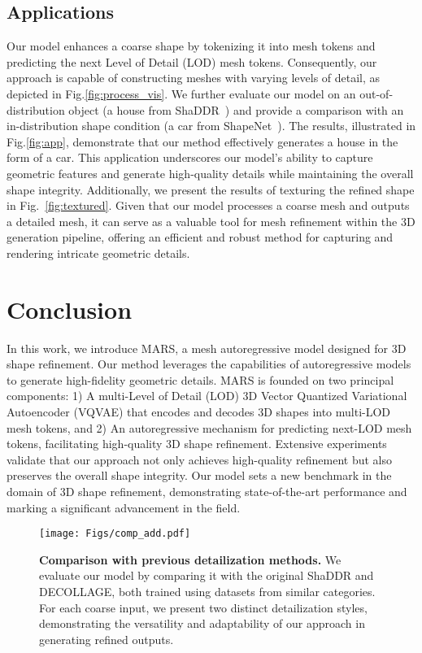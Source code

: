\subsection{Applications}
Our model enhances a coarse shape by tokenizing it into mesh tokens and predicting the next Level of Detail (LOD) mesh tokens. Consequently, our approach is capable of constructing meshes with varying levels of detail, as depicted in Fig.\ref{fig:process_vis}. We further evaluate our model on an out-of-distribution object (a house from ShaDDR~\cite{shaddr}) and provide a comparison with an in-distribution shape condition (a car from ShapeNet~\cite{shapenet}). The results, illustrated in Fig.\ref{fig:app}, demonstrate that our method effectively generates a house in the form of a car. This application underscores our model's ability to capture geometric features and generate high-quality details while maintaining the overall shape integrity. Additionally, we present the results of texturing the refined shape in Fig.~\ref{fig:textured}. Given that our model processes a coarse mesh and outputs a detailed mesh, it can serve as a valuable tool for mesh refinement within the 3D generation pipeline, offering an efficient and robust method for capturing and rendering intricate geometric details.


\section{Conclusion}
In this work, we introduce MARS, a mesh autoregressive model designed for 3D shape refinement. Our method leverages the capabilities of autoregressive models to generate high-fidelity geometric details. MARS is founded on two principal components: 1) A multi-Level of Detail (LOD) 3D Vector Quantized Variational Autoencoder (VQVAE) that encodes and decodes 3D shapes into multi-LOD mesh tokens, and 2) An autoregressive mechanism for predicting next-LOD mesh tokens, facilitating high-quality 3D shape refinement. Extensive experiments validate that our approach not only achieves high-quality refinement but also preserves the overall shape integrity. Our model sets a new benchmark in the domain of 3D shape refinement, demonstrating state-of-the-art performance and marking a significant advancement in the field.

\newpage





\begin{figure*}
    \centering
    \texttt{[image: Figs/comp\_add.pdf]}
    \caption{\textbf{Comparison with previous detailization methods.} We evaluate our model by comparing it with the original ShaDDR and DECOLLAGE, both trained using datasets from similar categories. For each coarse input, we present two distinct detailization styles, demonstrating the versatility and adaptability of our approach in generating refined outputs.}
    \label{fig:single}
\end{figure*}    

